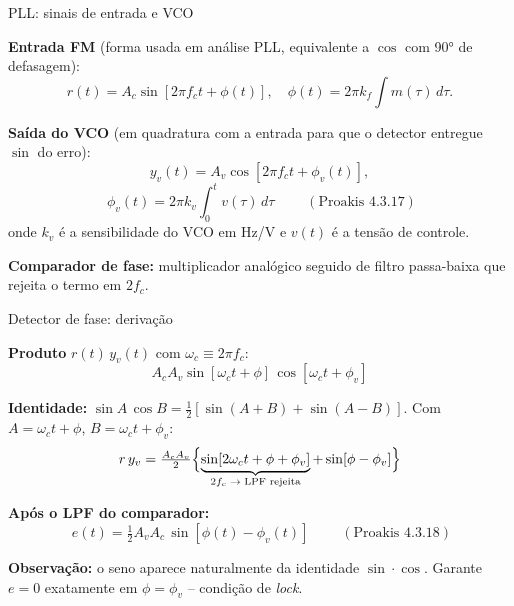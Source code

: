 \begin{frame}{PLL: sinais de entrada e VCO}

\textbf{Entrada FM} (forma usada em análise PLL, equivalente a $\cos$ com 90° de defasagem):
\[
r(t) = A_c \sin[2\pi f_c t + \phi(t)], \quad \phi(t) = 2\pi k_f\!\int m(\tau)\,d\tau.
\]

\pause
\textbf{Saída do VCO} (em quadratura com a entrada para que o detector entregue $\sin$ do erro):
\[
y_v(t) = A_v \cos[2\pi f_c t + \phi_v(t)],
\]
\[
\boxed{\;\phi_v(t) = 2\pi k_v \int_0^t v(\tau)\,d\tau\;} \qquad (\text{Proakis 4.3.17})
\]
onde $k_v$ é a sensibilidade do VCO em Hz/V e $v(t)$ é a tensão de controle.

\pause
\textbf{Comparador de fase:} multiplicador analógico seguido de filtro passa-baixa que rejeita o termo em $2 f_c$.

\end{frame}


\begin{frame}{Detector de fase: derivação}

\textbf{Produto} $r(t)\,y_v(t)$ com $\omega_c \equiv 2\pi f_c$:
\[
A_c A_v \sin[\omega_c t + \phi]\,\cos[\omega_c t + \phi_v]
\]

\pause
\textbf{Identidade:} $\sin A\,\cos B = \tfrac{1}{2}[\sin(A+B) + \sin(A-B)]$. Com $A = \omega_c t + \phi$, $B = \omega_c t + \phi_v$:
\[
r\,y_v = \tfrac{A_c A_v}{2}\Bigl\{\underbrace{\sin[2\omega_c t + \phi + \phi_v]}_{2f_c\;\to\;\text{LPF rejeita}} + \sin[\phi - \phi_v]\Bigr\}
\]

\pause
\textbf{Após o LPF do comparador:}
\[
\boxed{\;e(t) = \tfrac{1}{2}A_v A_c\,\sin[\phi(t) - \phi_v(t)]\;} \qquad (\text{Proakis 4.3.18})
\]

\pause
\textbf{Observação:} o seno aparece naturalmente da identidade $\sin\!\cdot\!\cos$. Garante $e = 0$ exatamente em $\phi = \phi_v$ -- condição de \emph{lock}.

\end{frame}


